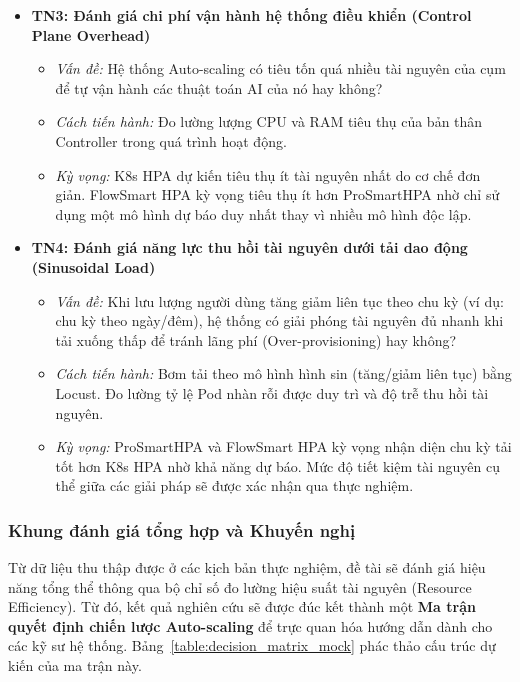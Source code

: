 \documentclass[14pt]{article}
\begin{document}
\begin{itemize}[leftmargin=1.5cm, label=\textbullet]
    \item \textbf{TN3: Đánh giá chi phí vận hành hệ thống điều khiển (Control Plane Overhead)}
    \begin{itemize}[label=--]
        \item \textit{Vấn đề:} Hệ thống Auto-scaling có tiêu tốn quá nhiều tài nguyên của cụm để tự vận hành các thuật toán AI của nó hay không?
        \item \textit{Cách tiến hành:} Đo lường lượng CPU và RAM tiêu thụ của bản thân Controller trong quá trình hoạt động.
        \item \textit{Kỳ vọng:} K8s HPA dự kiến tiêu thụ ít tài nguyên nhất do cơ chế đơn giản. FlowSmart HPA kỳ vọng tiêu thụ ít hơn ProSmartHPA nhờ chỉ sử dụng một mô hình dự báo duy nhất thay vì nhiều mô hình độc lập.
    \end{itemize}

    \item \textbf{TN4: Đánh giá năng lực thu hồi tài nguyên dưới tải dao động (Sinusoidal Load)}
    \begin{itemize}[label=--]
        \item \textit{Vấn đề:} Khi lưu lượng người dùng tăng giảm liên tục theo chu kỳ (ví dụ: chu kỳ theo ngày/đêm), hệ thống có giải phóng tài nguyên đủ nhanh khi tải xuống thấp để tránh lãng phí (Over-provisioning) hay không?
        \item \textit{Cách tiến hành:} Bơm tải theo mô hình hình sin (tăng/giảm liên tục) bằng Locust. Đo lường tỷ lệ Pod nhàn rỗi được duy trì và độ trễ thu hồi tài nguyên.
        \item \textit{Kỳ vọng:} ProSmartHPA và FlowSmart HPA kỳ vọng nhận diện chu kỳ tải tốt hơn K8s HPA nhờ khả năng dự báo. Mức độ tiết kiệm tài nguyên cụ thể giữa các giải pháp sẽ được xác nhận qua thực nghiệm.
    \end{itemize}

\end{itemize}

\subsubsection{Khung đánh giá tổng hợp và Khuyến nghị}

Từ dữ liệu thu thập được ở các kịch bản thực nghiệm, đề tài sẽ đánh giá hiệu năng tổng thể thông qua bộ chỉ số đo lường hiệu suất tài nguyên (Resource Efficiency). Từ đó, kết quả nghiên cứu sẽ được đúc kết thành một \textbf{Ma trận quyết định chiến lược Auto-scaling} để trực quan hóa hướng dẫn dành cho các kỹ sư hệ thống. Bảng~\ref{table:decision_matrix_mock} phác thảo cấu trúc dự kiến của ma trận này.
\end{document}
